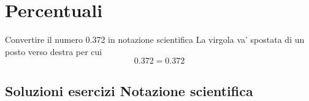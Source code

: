 \chapter{Percentuali}
\begin{exercise}
	Convertire il numero \num{0.372} in notazione scientifica
	\tcblower
	La virgola va' spostata di un posto verso destra per cui
	\[\num{0.372}=\num[scientific-notation=true]{0.372}\]
\end{exercise}
\tcbstoprecording
\newpage
\section{Soluzioni esercizi Notazione scientifica}
\tcbinputrecords